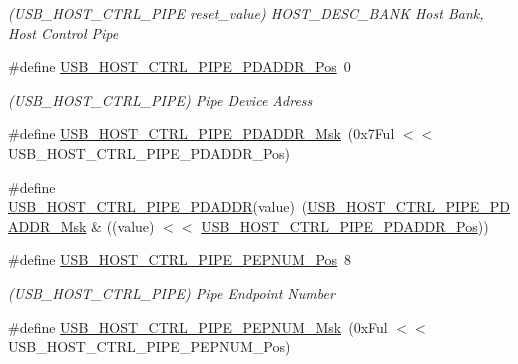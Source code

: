 \begin{DoxyCompactItemize}
\begin{DoxyCompactList}\small\item\em (U\+S\+B\+\_\+\+H\+O\+S\+T\+\_\+\+C\+T\+R\+L\+\_\+\+P\+I\+PE reset\+\_\+value) H\+O\+S\+T\+\_\+\+D\+E\+S\+C\+\_\+\+B\+A\+NK Host Bank, Host Control Pipe \end{DoxyCompactList}\item 
\#define \mbox{\hyperlink{group___s_a_m_d21___u_s_b_ga9cd5539debbbaaab60a622e533592b44}{U\+S\+B\+\_\+\+H\+O\+S\+T\+\_\+\+C\+T\+R\+L\+\_\+\+P\+I\+P\+E\+\_\+\+P\+D\+A\+D\+D\+R\+\_\+\+Pos}}~0
\begin{DoxyCompactList}\small\item\em (U\+S\+B\+\_\+\+H\+O\+S\+T\+\_\+\+C\+T\+R\+L\+\_\+\+P\+I\+PE) Pipe Device Adress \end{DoxyCompactList}\item 
\#define \mbox{\hyperlink{group___s_a_m_d21___u_s_b_ga1c29496dd25bb03181fdb8f4a5915baa}{U\+S\+B\+\_\+\+H\+O\+S\+T\+\_\+\+C\+T\+R\+L\+\_\+\+P\+I\+P\+E\+\_\+\+P\+D\+A\+D\+D\+R\+\_\+\+Msk}}~(0x7\+Ful $<$$<$ U\+S\+B\+\_\+\+H\+O\+S\+T\+\_\+\+C\+T\+R\+L\+\_\+\+P\+I\+P\+E\+\_\+\+P\+D\+A\+D\+D\+R\+\_\+\+Pos)
\item 
\#define \mbox{\hyperlink{group___s_a_m_d21___u_s_b_ga15bad546d52a34b5cfe0cbca95ded474}{U\+S\+B\+\_\+\+H\+O\+S\+T\+\_\+\+C\+T\+R\+L\+\_\+\+P\+I\+P\+E\+\_\+\+P\+D\+A\+D\+DR}}(value)~(\mbox{\hyperlink{group___s_a_m_d21___u_s_b_ga1c29496dd25bb03181fdb8f4a5915baa}{U\+S\+B\+\_\+\+H\+O\+S\+T\+\_\+\+C\+T\+R\+L\+\_\+\+P\+I\+P\+E\+\_\+\+P\+D\+A\+D\+D\+R\+\_\+\+Msk}} \& ((value) $<$$<$ \mbox{\hyperlink{group___s_a_m_d21___u_s_b_ga9cd5539debbbaaab60a622e533592b44}{U\+S\+B\+\_\+\+H\+O\+S\+T\+\_\+\+C\+T\+R\+L\+\_\+\+P\+I\+P\+E\+\_\+\+P\+D\+A\+D\+D\+R\+\_\+\+Pos}}))
\item 
\#define \mbox{\hyperlink{group___s_a_m_d21___u_s_b_gaa3bfb733faf29dee4ab9782319c7ae22}{U\+S\+B\+\_\+\+H\+O\+S\+T\+\_\+\+C\+T\+R\+L\+\_\+\+P\+I\+P\+E\+\_\+\+P\+E\+P\+N\+U\+M\+\_\+\+Pos}}~8
\begin{DoxyCompactList}\small\item\em (U\+S\+B\+\_\+\+H\+O\+S\+T\+\_\+\+C\+T\+R\+L\+\_\+\+P\+I\+PE) Pipe Endpoint Number \end{DoxyCompactList}\item 
\#define \mbox{\hyperlink{group___s_a_m_d21___u_s_b_ga9a451c832de1b4b7e33559df4478c676}{U\+S\+B\+\_\+\+H\+O\+S\+T\+\_\+\+C\+T\+R\+L\+\_\+\+P\+I\+P\+E\+\_\+\+P\+E\+P\+N\+U\+M\+\_\+\+Msk}}~(0x\+Ful $<$$<$ U\+S\+B\+\_\+\+H\+O\+S\+T\+\_\+\+C\+T\+R\+L\+\_\+\+P\+I\+P\+E\+\_\+\+P\+E\+P\+N\+U\+M\+\_\+\+Pos)
$$
\end{DoxyCompactItemize}
